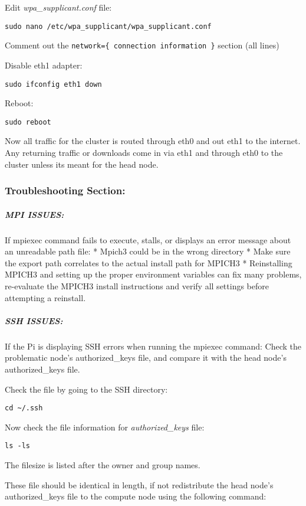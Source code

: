 \documentclass[]{article}
\let\oldsubparagraph\subparagraph
\renewcommand{\subparagraph}[1]{\oldsubparagraph{#1}\mbox{}}
\begin{document}
Edit \emph{wpa\_supplicant.conf} file:

\texttt{sudo\ nano\ /etc/wpa\_supplicant/wpa\_supplicant.conf}

Comment out the \texttt{network=\{\ connection\ information\ \}} section
(all lines)

Disable eth1 adapter:

\texttt{sudo\ ifconfig\ eth1\ down}

Reboot:

\texttt{sudo\ reboot}

Now all traffic for the cluster is routed through eth0 and out eth1 to
the internet. Any returning traffic or downloads come in via eth1 and
through eth0 to the cluster unless its meant for the head node.

\subsubsection{Troubleshooting Section:}\label{troubleshooting-section}

\subparagraph{MPI ISSUES:}\label{mpi-issues}

If mpiexec command fails to execute, stalls, or displays an error
message about an unreadable path file: * Mpich3 could be in the wrong
directory * Make sure the export path correlates to the actual install
path for MPICH3 * Reinstalling MPICH3 and setting up the proper
environment variables can fix many problems, re-evaluate the MPICH3
install instructions and verify all settings before attempting a
reinstall.

\subparagraph{SSH ISSUES:}\label{ssh-issues}

If the Pi is displaying SSH errors when running the mpiexec command:
Check the problematic node's authorized\_keys file, and compare it with
the head node's authorized\_keys file.

Check the file by going to the SSH directory:

\begin{verbatim}
cd ~/.ssh
\end{verbatim}

Now check the file information for \emph{authorized\_keys} file:

\begin{verbatim}
ls -ls
\end{verbatim}

The filesize is listed after the owner and group names.

These file should be identical in length, if not redistribute the head
node's authorized\_keys file to the compute node using the following
command:
\end{document}
